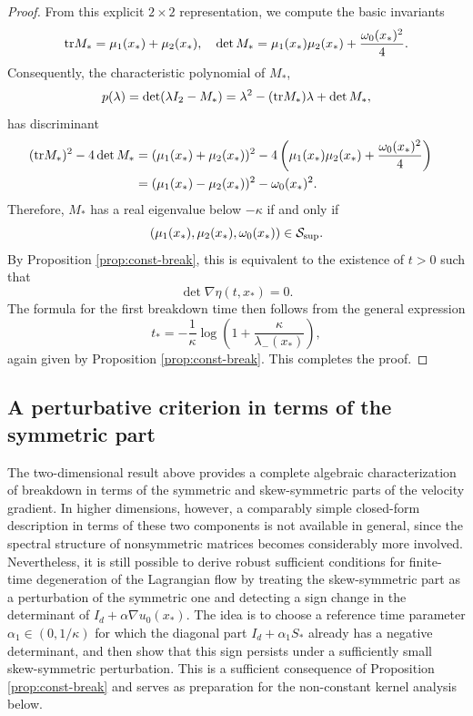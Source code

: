 \documentclass[11pt]{amsart}
\numberwithin{equation}{section}
\theoremstyle{definition}
\theoremstyle{remark}
\numberwithin{equation}{section}
\newcommand{\lt}{\left}
\newcommand{\rt}{\right}
\newcommand{\calS}{\mathcal S}
\newcommand{\tr}{{\rm tr}}
\begin{document}
\begin{proof}
From this explicit $2\times2$ representation, we compute the basic invariants
\[
\tr M_*=\mu_1(x_*)+\mu_2(x_*), \quad \det M_* =\mu_1(x_*)\mu_2(x_*) + \frac{\omega_0(x_*)^2}4.
\]
Consequently, the characteristic polynomial of $M_*$,
\[
p(\lambda)=\det(\lambda I_2-M_*) =\lambda^2-(\tr M_*)\lambda+\det M_*,
\]
has discriminant
\begin{align*}
(\tr M_*)^2-4\det M_* &=(\mu_1(x_*)+\mu_2(x_*))^2-4\lt(\mu_1(x_*)\mu_2(x_*) + \frac{\omega_0(x_*)^2}4\rt)\cr
&=(\mu_1(x_*)-\mu_2(x_*))^2- \omega_0(x_*)^2.
\end{align*}
Therefore, $M_*$ has a real eigenvalue below $-\kappa$ if and only if
\[
(\mu_1(x_*),\mu_2(x_*),\omega_0(x_*))\in \calS_{\rm sup}.
\]
By Proposition \ref{prop:const-break}, this is equivalent to the existence of $t>0$ such that
\[
\det\nabla\eta(t,x_*)=0.
\]
The formula for the first breakdown time then follows from the general expression
\[
t_*=-\frac1\kappa\log\lt(1+\frac{\kappa}{\lambda_-(x_*)}\rt),
\]
again given by Proposition \ref{prop:const-break}. This completes the proof.
\end{proof}
 
  
 
%
%
%                       
%
%

\subsection{A perturbative criterion in terms of the symmetric part}

The two-dimensional result above provides a complete algebraic characterization of breakdown in terms of the symmetric and skew-symmetric parts of the velocity gradient. In higher dimensions, however, a comparably simple closed-form description in terms of these two components is not available in general, since the spectral structure of nonsymmetric matrices becomes considerably more involved. Nevertheless, it is still possible to derive robust sufficient conditions for finite-time degeneration of the Lagrangian flow by treating the skew-symmetric part as a perturbation of the symmetric one and detecting a sign change in the determinant of $I_d+\alpha\nabla u_0(x_*)$. The idea is to choose a reference time parameter $\alpha_1\in(0,1/\kappa)$ for which the diagonal part $I_d+\alpha_1 S_*$ already has a negative determinant, and then show that this sign persists under a sufficiently small skew-symmetric perturbation. This is a sufficient consequence of Proposition \ref{prop:const-break} and serves as preparation for the non-constant kernel analysis below. 
\end{document}
